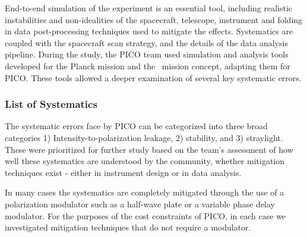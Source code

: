\documentclass[PICOReport.tex]{subfiles}
\begin{document}
End-to-end simulation of the experiment is an essential tool,
including realistic instabilities and non-idealities of the spacecraft,
telescope, instrument and folding in data post-processing techniques
used to mitigate the effects.  Systematics are coupled with the
spacecraft scan strategy, and the details of the 
data analysis pipeline.  During the study, the PICO team used 
 simulation and analysis tools developed for the Planck mission\cite{plank2015_xii_focalplane} and 
the \core\ mission concept, adapting them for PICO.  These tools allowed
a deeper examination of several key systematic errors. 

\subsubsection{List of Systematics}
The systematic errors face by PICO can be categorized into three broad categories 
1) Intensity-to-polarization leakage, 2) stability, and 3)
straylight.    These were prioritized for further study based on the
team's assessment of how well these systematics are understood by the
community, whether mitigation techniques exist - either in instrument
design or in data analysis.

In many cases the systematics are completely mitigated through the use of a polarization modulator such as a half-wave plate or a variable phase delay modulator.  
For the purposes of the cost constraints of PICO, in each case we investigated mitigation techniques that do not require a modulator.
\end{document}
